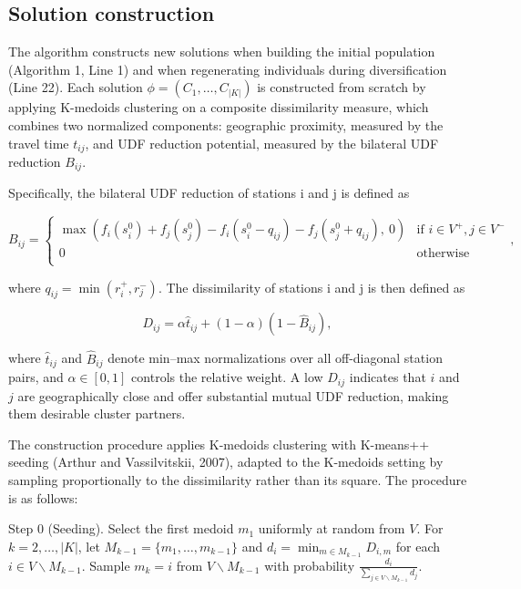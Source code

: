 \documentclass[11pt]{article}
\numberwithin{table}{section}
\numberwithin{figure}{section}
\begin{document}
\subsection{Solution construction}

The algorithm constructs new solutions when building the initial population (Algorithm 1, Line 1) and when regenerating individuals during diversification (Line 22). Each solution $\phi =({{C}_{1}},\ldots ,{{C}_{\left| K \right|}})$ is constructed from scratch by applying K-medoids clustering on a composite dissimilarity measure, which combines two normalized components: geographic proximity, measured by the travel time ${{t}_{ij}}$, and UDF reduction potential, measured by the bilateral UDF reduction ${{B}_{ij}}$.

Specifically, the bilateral UDF reduction of stations i and j is defined as

\[
{{B}_{ij}}=\left\{ \begin{array}{*{35}{l}}
\max ({{f}_{i}}(s_{i}^{0})+{{f}_{j}}(s_{j}^{0})-{{f}_{i}}(s_{i}^{0}-{{q}_{ij}})-{{f}_{j}}(s_{j}^{0}+{{q}_{ij}}),\ 0) & \text{if }i\in {{V}^{+}},j\in {{V}^{-}}  \\
0 & \text{otherwise}  \\
\end{array} \right.,
\]

where ${{q}_{ij}}=\min (r_{i}^{+},r_{j}^{-})$. The dissimilarity of stations i and j is then defined as

\[
{{D}_{ij}}=\alpha {{\hat{t}}_{ij}}+(1-\alpha )(1-{{\hat{B}}_{ij}}),
\]

where ${{\hat{t}}_{ij}}$ and ${{\hat{B}}_{ij}}$ denote min–max normalizations over all off-diagonal station pairs, and $\alpha \in [0,1]$ controls the relative weight. A low ${{D}_{ij}}$ indicates that $i$ and $j$ are geographically close and offer substantial mutual UDF reduction, making them desirable cluster partners.

The construction procedure applies K-medoids clustering with K-means++ seeding (Arthur and Vassilvitskii, 2007), adapted to the K-medoids setting by sampling proportionally to the dissimilarity rather than its square. The procedure is as follows:

Step 0 (Seeding). Select the first medoid ${{m}_{1}}$ uniformly at random from $V$. For $k=2,\ldots ,\left| K \right|$, let ${{M}_{k-1}}=\{{{m}_{1}},\ldots ,{{m}_{k-1}}\}$ and ${{d}_{i}}={{\min }_{m\in {{M}_{k-1}}}}{{D}_{i,m}}$ for each $i\in V\backslash {{M}_{k-1}}$. Sample ${{m}_{k}}=i$ from $V\backslash {{M}_{k-1}}$ with probability $\frac{{{d}_{i}}}{\sum\limits_{j\in V\backslash {{M}_{k-1}}}{{{d}_{j}}}}.$
\end{document}
